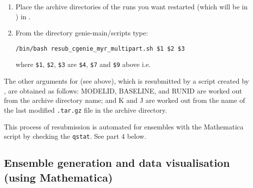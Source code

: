 \documentclass[10pt,a4paper, onecolumn]{article}
\begin{document}
\begin{enumerate}

\item Place the archive directories of the runs you want restarted (which will be in \texttt{}) in \texttt{}.

\item From the directory genie-main/scripts type:

\texttt{/bin/bash resub\_cgenie\_myr\_multipart.sh \$1 \$2 \$3}

where \texttt{\$1}, \texttt{\$2}, \texttt{\$3} are \texttt{\$4}, \texttt{\$7} and \texttt{\$9} above i.e.


\end{enumerate}

The other arguments for \texttt{} (see above), which is resubmitted by a script \texttt{} created by \texttt{}, are obtained as follows: MODELID, BASELINE, and RUNID are worked out from the archive directory name; and K and J are worked out from the name of the last modified \texttt{.tar.gz} file in the archive directory.

This process of resubmission is automated for ensembles with the Mathematica script \texttt{} by checking the \texttt{qstat}. See part 4 below.


\subsection{Ensemble generation and data visualisation (using Mathematica)}\label{sec:Ensemble generation and data visualisation (using Mathematica)}
\end{document}
